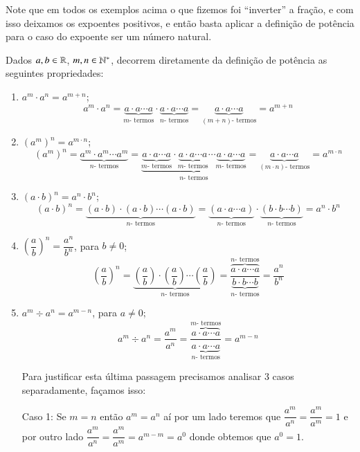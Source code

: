  Note que em todos os exemplos acima o que fizemos foi ``inverter'' a fração, e com isso deixamos os expoentes positivos, e então basta aplicar a definição de potência para o caso do expoente ser um número natural.

  Dados $a, b \in \mathbb{R}$, $m, n \in \mathbb{N}^{*}$, decorrem diretamente da definição de potência as seguintes propriedades:
 \begin{enumerate}[P1)]
 \item $a^m \cdot a^n= a^{m + n}$;
 \[a^m \cdot a^n = \underbrace{a \cdot a \cdots a}_{m \text{- termos}}\cdot \underbrace{a \cdot a \cdots a}_{n \text{- termos}}= \underbrace{a \cdot a \cdots a}_{(m+n) \text{- termos}}= a^{m + n} \]

 \item $(a^m)^n= a^{m \cdot n}$;
 \[(a^m)^n= \underbrace{a^m \cdot a^m \cdots a^m}_{n \text{- termos}}= \underbrace{\underbrace{a \cdot a \cdots a}_{m \text{- termos}} \cdot \underbrace{a \cdot a \cdots a}_{m \text{- termos}} \cdots \underbrace{a \cdot a \cdots a}_{m \text{- termos}}}_{n \text{- termos}}= \underbrace{a \cdot a \cdots a}_{(m \cdot n) \text{- termos}}= a^{m \cdot n}\]

 \item $(a \cdot b)^n= a^n \cdot b^n$;
 \[(a \cdot b)^n= \underbrace{(a \cdot b) \cdot (a\cdot b) \cdots (a \cdot b)}_{n \text{- termos}}= \underbrace{(a \cdot a \cdots a)}_{n \text{- termos}} \cdot \underbrace{(b \cdot b \cdots b)}_{n \text{- termos}}= a^n \cdot b^n\]

 \item $\left(\dfrac{a}{b}\right)^n= \dfrac{a^n}{b^n}$, para $b \neq 0$;
 \[\left(\dfrac{a}{b}\right)^n=
 \underbrace{\left(\dfrac{a}{b}\right) \cdot \left(\dfrac{a}{b}\right) \cdots \left(\dfrac{a}{b}\right)}_{n \text{- termos}}= \dfrac{\overbrace{a \cdot a \cdots a}^{n \text{- termos}}}{\underbrace{b \cdot b \cdots b}_{n \text{- termos}}}= \dfrac{a^n}{b^n}\]

 \item $a^m \div a^n= a^{m - n}$, para $a \neq 0$;
 \[a^m \div a^n= \dfrac{a^m}{a^n}= \dfrac{\overbrace{a \cdot a \cdots a}^{m \text{- termos}}}{\underbrace{a \cdot a \cdots a}_{n \text{- termos}}} = a^{m - n}\]

 Para justificar esta última passagem precisamos analisar 3 casos separadamente, façamos isso:

 Caso 1: Se $m=n$ então $a^m= a^n$ aí por um lado teremos que $\dfrac{a^m}{a^n}= \dfrac{a^m}{a^m}= 1$ e por outro lado $\dfrac{a^m}{a^n}= \dfrac{a^m}{a^m}= a^{m-m}= a^{0}$ donde obtemos que $a^{0}= 1$.


\end{enumerate}
